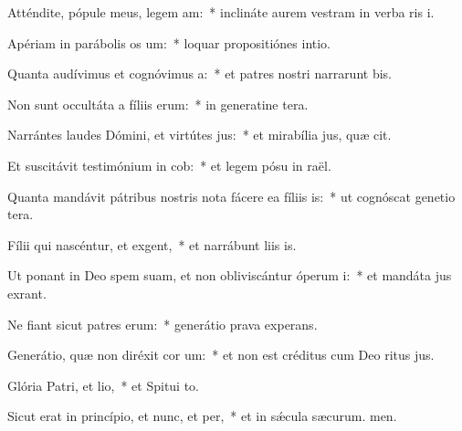 \item Atténdite, pópule meus, legem am:~* inclináte aurem vestram in verba ris i.
\item Apériam in parábolis os um:~* loquar propositiónes  intio.
\item Quanta audívimus et cognóvimus a:~* et patres nostri narrarunt bis.
\item Non sunt occultáta a fíliis erum:~* in generatine tera.
\item Narrántes laudes Dómini, et virtútes jus:~* et mirabília jus, quæ cit.
\item Et suscitávit testimónium in cob:~* et legem pósu in raël.
\item Quanta mandávit pátribus nostris nota fácere ea fíliis is:~* ut cognóscat genetio tera.
\item Fílii qui nascéntur, et exgent,~* et narrábunt liis is.
\item Ut ponant in Deo spem suam, et non obliviscántur óperum i:~* et mandáta jus exrant.
\item Ne fiant sicut patres erum:~* generátio prava  experans.
\item Generátio, quæ non diréxit cor um:~* et non est créditus cum Deo ritus jus.
\item Glória Patri, et lio,~* et Spitui to.
\item Sicut erat in princípio, et nunc, et per,~* et in sǽcula sæcurum. men.
